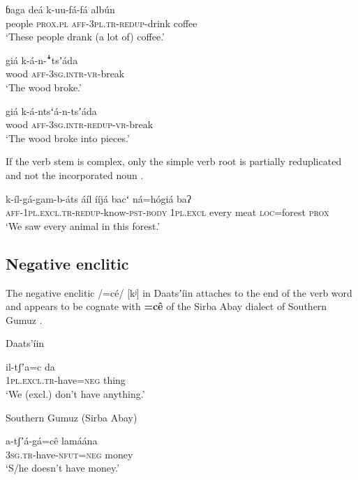 \documentclass[output=paper]{langsci/langscibook}
\begin{document}
\ea\label{ex:ahlandc:37}
\gll
ɓaga  deá  k-uu-fá-fá   alb\'{u}n   \\
people  \textsc{prox.pl}  \textsc{aff-3pl.tr-redup}{}-drink   coffee \\
\glt
‘These people drank (a lot of) coffee.’ 
\z

\ea\label{ex:ahlandc:38}
\gll
giá     k-á-n-\textsf{ꜜ}tsʼáda \\
wood \textsc{aff-3sg.intr}{}-\textsc{vr-}break \\
\glt
‘The wood broke.’
\z

\ea\label{ex:ahlandc:39}
\gll
giá       k-á-ntsʻá-n-tsʼáda  \\
wood  \textsc{aff-3sg.intr}{}-\textsc{redup}{}-\textsc{vr}{}-break \\
\glt
 ‘The wood broke into pieces.’
\z

If the verb stem is complex, only the simple verb root is partially reduplicated and not the incorporated noun . 

\ea\label{ex:ahlandc:40}
\gll
k-íl-gá-gam-b-áts                                        áíl           ííjá      bacʻ   ná=h\'{o}giá  baʔ \\
\textsc{aff-1pl.excl.tr-redup}{}-know-\textsc{pst-body} \textsc{1pl.excl} every  meat  \textsc{loc}=forest \textsc{prox} \\
\glt
‘We saw every animal in this forest.’
\z


\subsection{Negative enclitic}\label{sec:ahlandc:4.8}

The negative enclitic /=cé/ [kʲ] in Daatsʼíin  attaches to the end of the verb word and appears to be cognate with \textbf{=c\^{e}} of the Sirba Abay dialect of Southern Gumuz  \citep[cf.][241-242]{CAhland2012}. 

\ea\label{ex:ahlandc:41}
Daats’íin

\gll
il-tʃʼa=c   da \\
\textsc{  1pl.excl.tr}{}-have=\textsc{neg}     thing \\
\glt
  ‘We (excl.) don’t have anything.’
\z

\ea\label{ex:ahlandc:42}
Southern Gumuz (Sirba Abay)

\gll
  a-tʃʼá-gá=c\^{e}                      lamáána \\
\textsc{  3sg.tr}{}-have-\textsc{nfut=neg  } money \\
\glt
  ‘S/he doesn’t have money.’
\z
\end{document}
